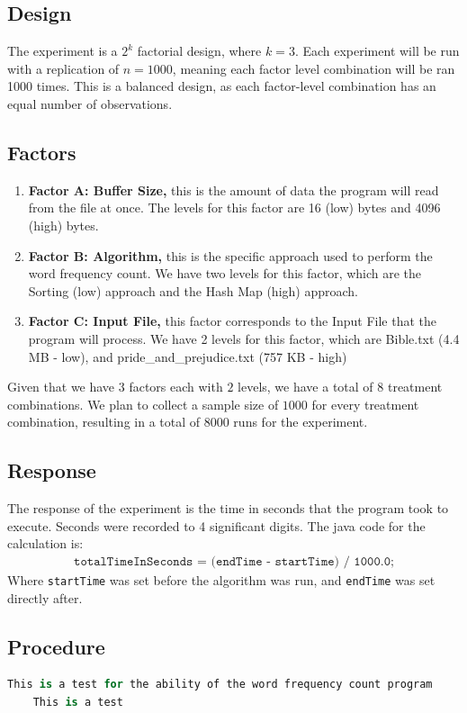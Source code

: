 \documentclass{article}
\begin{document}
\subsection{Design}
  The experiment is a $2^k$ factorial design, where $k=3$.
  Each experiment will be run with a replication of $n=1000$,
  meaning each factor level combination will be ran 1000 times.
  This is a balanced design, as each factor-level
  combination has an equal number of observations.

\subsection{Factors}
  \begin{enumerate}
    \item \textbf{Factor A: Buffer Size,} this is the amount of data the program will read from the file at once. The levels for this factor are 16 (low) bytes and 4096 (high) bytes.
    \item \textbf{Factor B: Algorithm,} this is the specific approach used to perform the word frequency count. We have two levels for this factor, which are the Sorting (low) approach and the Hash Map (high) approach.
    \item \textbf{Factor C: Input File,} this factor corresponds to the Input File that the program will process. We have 2 levels for this factor, which are Bible.txt (4.4 MB - low), and pride\_and\_prejudice.txt (757 KB - high)
  \end{enumerate}

  Given that we have $3$ factors each with $2$ levels,
  we have a total of $8$ treatment combinations.
  We plan to collect a sample size of $1000$ for every treatment combination,
  resulting in a total of $8000$ runs for the experiment.

\subsection{Response}
  The response of the experiment is the time in seconds that the program took to execute.
  Seconds were recorded to 4 significant digits. The java code for the calculation is:
  \begin{align*}
    \texttt{totalTimeInSeconds = (endTime - startTime) / 1000.0;}
  \end{align*}
  Where \texttt{startTime} was set before the algorithm was run, and \texttt{endTime} was set directly after.

\subsection{Procedure}
  \begin{lstlisting}[language=Python, 
    basicstyle=\ttfamily\scriptsize, 
    numbers=none, 
    frame=single,
    showspaces=false,
    caption={A Sample test.txt file.}]
    This is a test for the ability of the word frequency count program
    This is a test
  \end{lstlisting}
\end{document}
